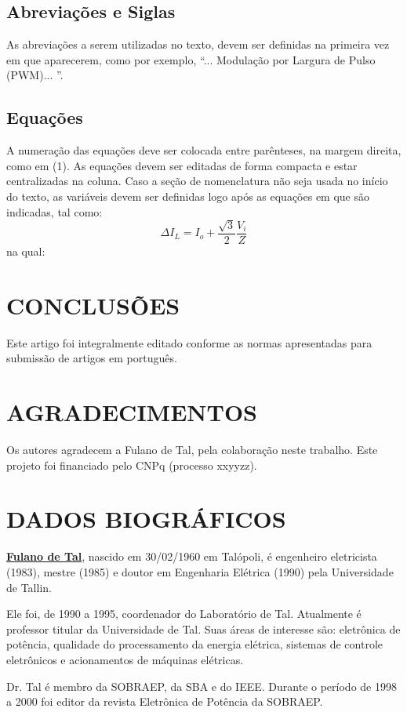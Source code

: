 \documentclass[portugues]{sobraep}
\begin{document}
\subsection{Abreviações e Siglas}

As abreviações a serem utilizadas no texto, devem ser definidas na primeira vez em que aparecerem, como por exemplo, ``... Modulação por Largura de Pulso  (PWM)... ''.

\subsection{Equações}

A numeração das equações deve ser colocada entre parênteses, na margem direita, como em (1). As equações devem ser editadas de forma compacta e estar centralizadas na coluna. Caso a seção de nomenclatura não seja usada no início do texto, as variáveis devem ser definidas logo após as equações em que são indicadas, tal como:
\begin{equation}
	\Delta I_{L}=I_{o}+\frac{\sqrt{3}}{2}\frac{V_{i}}{Z}
\end{equation}
na qual:


\section{CONCLUSÕES}
Este artigo foi integralmente editado conforme as normas apresentadas para submissão de artigos em português.

\section*{AGRADECIMENTOS}
Os autores agradecem a Fulano de Tal, pela colaboração neste trabalho. Este projeto foi financiado pelo CNPq (processo xxyyzz).




\section*{DADOS BIOGRÁFICOS}
\noindent\textbf{\underline{Fulano de Tal}}, nascido em 30/02/1960 em Talópoli, é engenheiro eletricista (1983), mestre (1985) e doutor em Engenharia Elétrica (1990) pela Universidade de Tallin.

Ele foi, de 1990 a 1995, coordenador do Laboratório de Tal. Atualmente é professor titular da Universidade de Tal. Suas áreas de interesse são: eletrônica de potência, qualidade do processamento da energia elétrica, sistemas de controle eletrônicos e acionamentos de máquinas elétricas.

Dr. Tal é membro da SOBRAEP, da SBA e do IEEE. Durante o período de 1998 a 2000 foi editor da revista Eletrônica de Potência da SOBRAEP.
\end{document}
